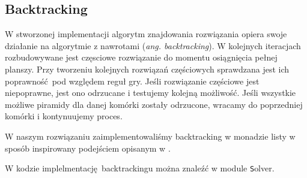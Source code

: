 \subsection{Backtracking}
W stworzonej implementacji algorytm znajdowania rozwiązania opiera swoje
działanie na algorytmie z nawrotami (\textit{ang. backtracking}).  W kolejnych
iteracjach rozbudowywane jest częsciowe rozwiązanie do momentu osiągnięcia
pełnej planszy.  Przy tworzeniu kolejnych rozwiązań częściowych sprawdzana
jest ich poprawność pod względem reguł gry.  Jeśli rozwiązanie częściowe
jest niepoprawne, jest ono odrzucane i testujemy kolejną możliwość.  Jeśli
wszystkie możliwe piramidy dla danej komórki zostały odrzucone, wracamy
do poprzedniej komórki i kontynuujemy proces.

W naszym rozwiązaniu zaimplementowaliśmy backtracking w monadzie listy
w sposób inspirowany podejściem opisanym w \cite{backtracking}.

W kodzie implelmentację backtrackingu można znaleźć w module {\texttt Solver}.
